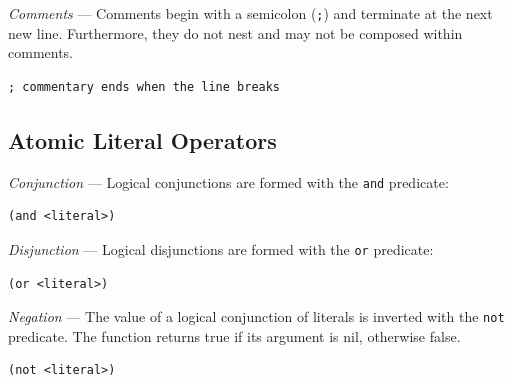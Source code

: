 \documentclass[
a4paper, %
11pt, %
onecolumn, %
openany, %
]{memoir}
\begin{document}
{\textit{Comments} --- Comments begin with a semicolon (\texttt{;}) and terminate at the next new line. Furthermore, they do not nest and may not be composed within comments.

\begin{lstlisting}
; commentary ends when the line breaks
\end{lstlisting}

\subsection{Atomic Literal Operators}

\textit{Conjunction} --- Logical conjunctions are formed with the \texttt{and} predicate: 

\begin{lstlisting}
(and <literal>)
\end{lstlisting}

\textit{Disjunction} --- Logical disjunctions are formed with the \texttt{or} predicate:

\begin{lstlisting}
(or <literal>)
\end{lstlisting}

\textit{Negation} --- The value of a logical conjunction of literals is inverted with the \texttt{not} predicate. The function returns true if its argument is nil, otherwise false.

\begin{lstlisting}
(not <literal>)
\end{lstlisting}


}
\end{document}
